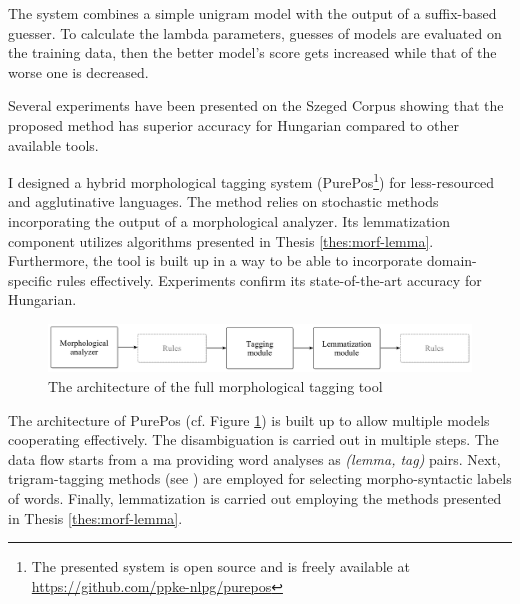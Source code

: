 The system combines a simple unigram model with the output of a suffix-based guesser. 
To calculate the lambda parameters, guesses of models are evaluated on the training data, then the better model's score gets increased while that of the worse one is decreased.

Several experiments have been presented on the Szeged Corpus showing that the proposed method has superior accuracy for Hungarian compared to other available tools. 

\thesisline%


\begin{core}
\begin{thesis}\label{thes:morf-tagging}
I designed a hybrid morphological tagging system (PurePos\footnote{The presented system is open source and is freely available at \href{https://github.com/ppke-nlpg/purepos}{https://github.com/ppke-nlpg/purepos}}) for less-resourced and agglutinative languages.
The method relies on stochastic methods incorporating the output of a morphological analyzer.
Its lemmatization component utilizes algorithms presented in Thesis \ref{thes:morf-lemma}.
Furthermore, the tool is built up in a way to be able to incorporate domain-specific rules effectively.
Experiments confirm its state-of-the-art accuracy for Hungarian.
\end{thesis}

\begin{pub}
\cite{Orosz2011,Orosz2012,Orosz2012a,Orosz2013a}
\end{pub}
\end{core}

\begin{figure}[ht] 
  \centering
  \includegraphics[width=1\textwidth]{MorphTagging/architecture.png} 
  \caption{The architecture of the full morphological tagging tool}
  \label{fig:purepos-arch_en}
\end{figure}

The architecture of PurePos (cf. Figure \ref{fig:purepos-arch_en}) is built up to allow multiple models cooperating effectively. 
The disambiguation is carried out in multiple steps.
The data flow starts from a \acrshort{ma} providing word analyses as \emph{(lemma, tag)} pairs. 
Next, trigram-tagging methods (see \cite{Brants2000,Halacsy2007}) are employed for selecting morpho-syntactic labels of words. 
Finally, lemmatization is carried out employing the methods presented in Thesis \ref{thes:morf-lemma}. 

